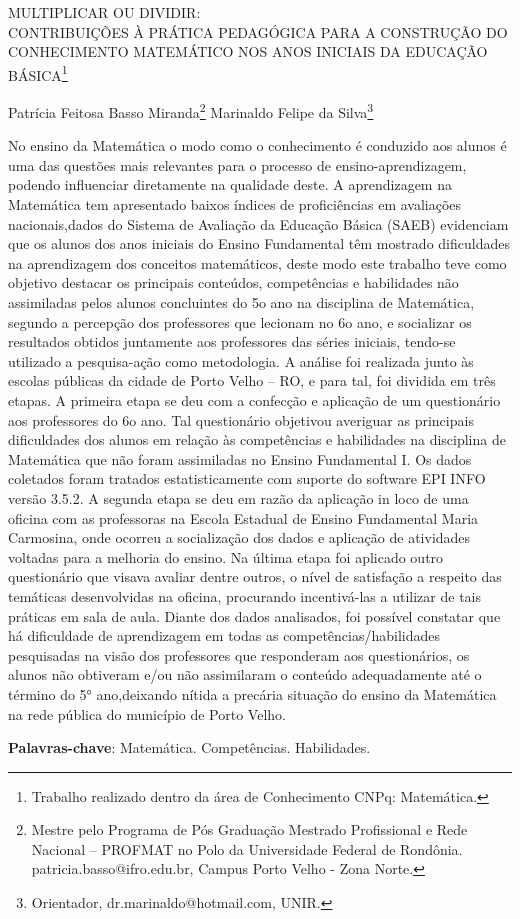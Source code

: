 \documentclass[article,12pt,onesidea,4paper,english,brazil]{abntex2}
\begin{document}
	
	
	\frenchspacing 
	
	\begin{center}
		\LARGE MULTIPLICAR OU DIVIDIR: \\CONTRIBUIÇÕES À PRÁTICA PEDAGÓGICA PARA A CONSTRUÇÃO DO CONHECIMENTO MATEMÁTICO NOS ANOS INICIAIS DA EDUCAÇÃO BÁSICA\footnote{Trabalho realizado dentro da área de Conhecimento CNPq: Matemática.}
		
		\normalsize
		Patrícia Feitosa Basso Miranda\footnote{Mestre pelo Programa de Pós Graduação Mestrado Profissional e Rede Nacional – PROFMAT no Polo da Universidade Federal de Rondônia. patricia.basso@ifro.edu.br, Campus Porto Velho - Zona Norte.} 
		Marinaldo Felipe da Silva\footnote{Orientador, dr.marinaldo@hotmail.com, UNIR.} 
	\end{center}
	
	\noindent No ensino da Matemática o modo como o conhecimento é conduzido aos alunos é
	uma das questões mais relevantes para o processo de ensino-aprendizagem,
	podendo influenciar diretamente na qualidade deste. A aprendizagem na Matemática
	tem apresentado baixos índices de proficiências em avaliações nacionais,dados do
	Sistema de Avaliação da Educação Básica (SAEB) evidenciam que os alunos dos
	anos iniciais do Ensino Fundamental têm mostrado dificuldades na aprendizagem
	dos conceitos matemáticos, deste modo este trabalho teve como objetivo destacar
	os principais conteúdos, competências e habilidades não assimiladas pelos alunos
	concluintes do 5o ano na disciplina de Matemática, segundo a percepção dos
	professores que lecionam no 6o ano, e socializar os resultados obtidos juntamente
	aos professores das séries iniciais, tendo-se utilizado a pesquisa-ação como
	metodologia. A análise foi realizada junto às escolas públicas da cidade de Porto
	Velho – RO, e para tal, foi dividida em três etapas. A primeira etapa se deu com a
	confecção e aplicação de um questionário aos professores do 6o ano. Tal
	questionário objetivou averiguar as principais dificuldades dos alunos em relação às
	competências e habilidades na disciplina de Matemática que não foram assimiladas
	no Ensino Fundamental I. Os dados coletados foram tratados estatisticamente com
	suporte do software EPI INFO versão 3.5.2. A segunda etapa se deu em razão da
	aplicação in loco de uma oficina com as professoras na Escola Estadual de Ensino
	Fundamental Maria Carmosina, onde ocorreu a socialização dos dados e aplicação
	de atividades voltadas para a melhoria do ensino. Na última etapa foi aplicado outro
	questionário que visava avaliar dentre outros, o nível de satisfação a respeito das
	temáticas desenvolvidas na oficina, procurando incentivá-las a utilizar de tais
	práticas em sala de aula. Diante dos dados analisados, foi possível constatar que há
	dificuldade de aprendizagem em todas as competências/habilidades pesquisadas na
	visão dos professores que responderam aos questionários, os alunos não obtiveram
	e/ou não assimilaram o conteúdo adequadamente até o término do 5° ano,deixando
	nítida a precária situação do ensino da Matemática na rede pública do município de
	Porto Velho.
	
	\vspace{\onelineskip}
	
	\noindent
	\textbf{Palavras-chave}: Matemática. Competências. Habilidades.
	
\end{document}
